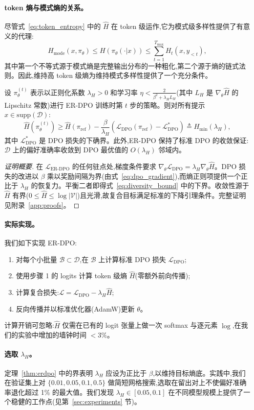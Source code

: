 \paragraph{token 熵与模式熵的关系。} 尽管式~\eqref{eq:token_entropy} 中的 $\hat{H}$ 在 token 级运作,它为模式级多样性提供了有意义的代理:
\begin{equation}
H_{\text{mode}}(x, \pi_\theta) \leq H(\pi_\theta(\cdot|x)) \leq \sum_{t=1}^{T_{\max}} H_t(x, y_{<t}),
\end{equation}
其中第一个不等式源于模式熵是完整输出分布的一种粗化,第二个源于熵的链式法则。因此,维持高 token 级熵为维持模式多样性提供了一个充分条件。

\begin{theorem}
\label{thm:erdpo}
设 $\pi_\theta^{(t)}$ 表示以正则化系数 $\lambda_H > 0$ 和学习率 $\eta < \frac{2}{\beta^2 + \lambda_H L_H}$(其中 $L_H$ 是 $\nabla_\theta \hat{H}$ 的 Lipschitz 常数)进行 ER-DPO 训练时第 $t$ 步的策略。则对所有提示 $x \in \text{supp}(\mathcal{D})$:
\begin{equation}
\label{eq:diversity_bound}
\hat{H}(\pi_\theta^{(t)}) \geq \hat{H}(\pi_{\text{ref}}) - \frac{\beta}{\lambda_H}\left(\mathcal{L}_{\text{DPO}}(\pi_{\text{ref}}) - \mathcal{L}_{\text{DPO}}^*\right) \triangleq H_{\min}(\lambda_H),
\end{equation}
其中 $\mathcal{L}_{\text{DPO}}^*$ 是 DPO 损失的下确界。此外,ER-DPO 保持了标准 DPO 的收敛保证:$\mathcal{D}$ 上的偏好准确率收敛到 DPO 最优值的 $O(\lambda_H)$ 邻域内。
\end{theorem}
\begin{proof}[证明概要]
在 $\mathcal{L}_{\text{ER-DPO}}$ 的任何驻点处,梯度条件要求 $\nabla_\theta \mathcal{L}_{\text{DPO}} = \lambda_H \nabla_\theta \hat{H}$。DPO 损失的改进以 $\beta$ 乘以奖励间隔为界(由式~\ref{eq:dpo_gradient}),而熵正则项提供一个正比于 $\lambda_H$ 的恢复力。平衡二者即得式~\eqref{eq:diversity_bound} 中的下界。收敛性源于 $\hat{H}$ 有界($0 \leq \hat{H} \leq \log|\mathcal{V}|$)且光滑,故复合目标满足标准的下降引理条件。完整证明见附录~\ref{app:proofs}。
\end{proof}

\paragraph{实际实现。} 我们如下实现 ER-DPO:
\begin{enumerate}[leftmargin=*,itemsep=2pt]
    \item 对每个小批量 $\mathcal{B} \subset \mathcal{D}$,在 $\mathcal{B}$ 上计算标准 DPO 损失 $\mathcal{L}_{\text{DPO}}$;
    \item 使用步骤 1 的 logits 计算 token 级熵 $\hat{H}$(零额外前向传播);
    \item 计算复合损失:$\mathcal{L} = \mathcal{L}_{\text{DPO}} - \lambda_H \hat{H}$;
    \item 反向传播并以标准优化器(AdamW)更新 $\theta$。
\end{enumerate}
计算开销可忽略:$\hat{H}$ 仅需在已有的 logit 张量上做一次 softmax 与逐元素 $\log$,在我们的实验中增加的墙钟时间 $<3\%$。

\paragraph{选取 $\lambda_H$。} 定理~\ref{thm:erdpo} 中的界表明 $\lambda_H$ 应设为正比于 $\beta$,以维持目标熵底。实践中,我们在验证集上对 $\{0.01, 0.05, 0.1, 0.5\}$ 做简短网格搜索,选取在留出对上不使偏好准确率退化超过 1\% 的最大值。我们发现 $\lambda_H \in [0.05, 0.1]$ 在不同模型规模上提供了一个稳健的工作点(见第~\ref{sec:experiments} 节)。
